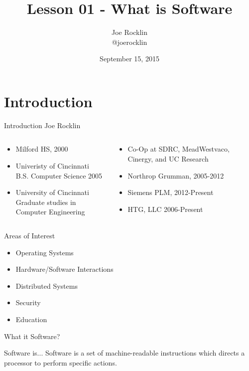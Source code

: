 \documentclass[serif,mathserif,compress]{beamer}
\author[Joe Rocklin]{Joe Rocklin\\@joerocklin}
\title[Lesson 01\hspace{2em}\insertframenumber/\inserttotalframenumber]{Lesson 01 - What is Software}
\date{September 15, 2015} %
\institute{Siemens PLM Software}
\begin{document}
\maketitle

\section{Introduction}  %

\begin{frame}{Introduction}
  Joe Rocklin
  \begin{columns}[T]
  \begin{column}[T]{.5\textwidth}
    \begin{itemize}
    \item Milford HS, 2000
    \item Univeristy of Cincinnati\\B.S. Computer Science 2005
    \item University of Cincinnati\\Graduate studies in Computer Engineering
    \end{itemize}
  \end{column}
  \pause
  \begin{column}[T]{.5\textwidth}
    \begin{itemize}
    \item Co-Op at SDRC, MeadWestvaco, Cinergy, and UC Research
    \item Northrop Grumman, 2005-2012
    \item Siemens PLM, 2012-Present
    \item HTG, LLC 2006-Present
    \end{itemize}
  \end{column}
  \end{columns}
\end{frame}

\begin{frame}{Areas of Interest}
  \begin{itemize}
  \item Operating Systems
  \item Hardware/Software Interactions
  \item Distributed Systems
  \item Security
  \item Education
  \end{itemize}
\end{frame}

\begin{frame}{What it Software?}
  \begin{block}{Software is...}
    Software is a set of machine-readable instructions which directs a processor to perform specific actions.
  \end{block}
\end{frame}
\end{document}
